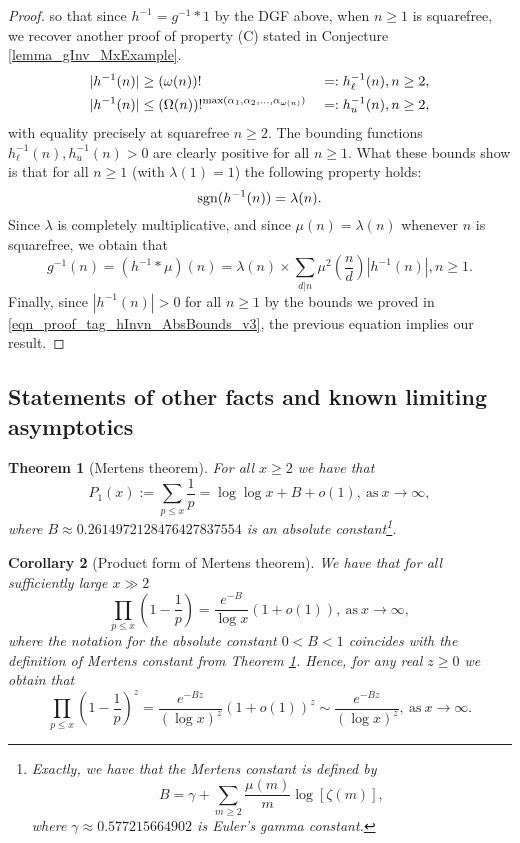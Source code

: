 \documentclass[11pt,reqno,a4letter]{article}
\numberwithin{figure}{section}
\numberwithin{table}{section}
\theoremstyle{plain}
\newtheorem{theorem}{Theorem}
\newtheorem{cor}[theorem]{Corollary}
\numberwithin{theorem}{section}
\theoremstyle{definition}
\begin{document}
\begin{proof}
{     so that since $h^{-1} = g^{-1} \ast 1$ by the DGF above, when $n \geq 1$ is 
     squarefree, we recover another proof of property (C) stated in 
     Conjecture \ref{lemma_gInv_MxExample}. 
} 
\begin{align} 
\label{eqn_proof_tag_hInvn_AbsBounds_v3} 
|h^{-1}(n)| & \geq (\omega(n))! && =: h_{\ell}^{-1}(n), n \geq 2, \\ 
\notag 
|h^{-1}(n)| & \leq (\Omega(n))!^{\max(\alpha_1, \alpha_2, \ldots, \alpha_{\omega(n)})} && =: h_u^{-1}(n), n \geq 2, 
\end{align} 
with equality precisely at squarefree $n \geq 2$. 
The bounding functions $h_{\ell}^{-1}(n), h_{u}^{-1}(n) > 0$ are clearly positive for all $n \geq 1$. 
What these bounds show is that for all $n \geq 1$ (with $\lambda(1) = 1$) the following property holds: 
\begin{equation} 
\notag 
\operatorname{sgn}(h^{-1}(n)) = \lambda(n). 
\end{equation} 
Since $\lambda$ is completely multiplicative, and since $\mu(n) = \lambda(n)$ whenever $n$ is squarefree, 
we obtain that 
\[
g^{-1}(n) = (h^{-1} \ast \mu)(n) = \lambda(n) \times \sum_{d|n} \mu^2\left(\frac{n}{d}\right) |h^{-1}(n)|, n \geq 1. 
\]
Finally, since $|h^{-1}(n)| > 0$ for all $n \geq 1$ by the bounds we proved in 
\eqref{eqn_proof_tag_hInvn_AbsBounds_v3}, the previous equation implies our result. 
\end{proof} 

\subsection{Statements of other facts and known limiting asymptotics} 
\label{subSection_OtherFactsAndResults} 

\begin{theorem}[Mertens theorem]
\label{theorem_Mertens_theorem} 
For all $x \geq 2$ we have that 
\[
P_1(x) := \sum_{p \leq x} \frac{1}{p} = \log\log x + B + o(1), 
     \mathrm{\ as\ } x \rightarrow \infty, 
\]
where 
$B \approx 0.2614972128476427837554$ 
is an absolute constant\footnote{ 
     Exactly, we have that the \emph{Mertens constant} is defined by 
     \[
     B = \gamma + \sum_{m \geq 2} \frac{\mu(m)}{m} \log\left[\zeta(m)\right], 
     \]
     where $\gamma \approx 0.577215664902$ is Euler's gamma constant. 
}.
\end{theorem} 

\begin{cor}[Product form of Mertens theorem] 
\label{lemma_Gz_productTermV2} 
We have that for all sufficiently large $x \gg 2$ 
\[
\prod_{p \leq x} \left(1 - \frac{1}{p}\right) = \frac{e^{-B}}{\log x}\left( 
     1 + o(1)\right), \mathrm{\ as\ } x \rightarrow \infty, 
\]
where the notation for the absolute constant $0 < B < 1$ coincides with the definition of 
Mertens constant from Theorem \ref{theorem_Mertens_theorem}. 
Hence, for any real $z \geq 0$ we obtain that 
\[
\prod_{p \leq x} \left(1 - \frac{1}{p}\right)^{z} = 
     \frac{e^{-Bz}}{(\log x)^{z}} \left(1+o(1)\right)^{z} \sim 
     \frac{e^{-Bz}}{(\log x)^{z}}, \mathrm{\ as\ } x \rightarrow \infty. 
\]
\end{cor} 
\end{document}
